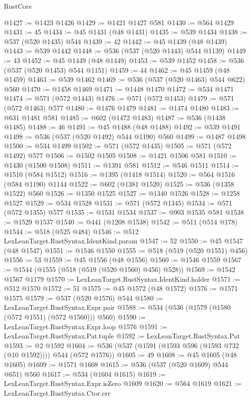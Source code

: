 \begin{lexlean}{RustCore}
\begin{coremodule}
@1427 := @1423 @1426
@1429 := @1421 @1427 @581
@1430 := @564 @1429
@1431 := 45
@1434 := @45 @1431 (@48 @1431)
@1435 := @539 @1434
@1438 := @537 (@520 @1435) @544
@1439 := 42
@1442 := @45 @1439 (@48 @1439)
@1443 := @539 @1442
@1448 := @536 (@537 (@520 @1443) @544 @1139)
@1449 := 43
@1452 := @45 @1449 (@48 @1449)
@1453 := @539 @1452
@1458 := @536 (@537 (@520 @1453) @544 @1151)
@1459 := 44
@1462 := @45 @1459 (@48 @1459)
@1463 := @539 @1462
@1469 := @536 (@537 (@520 @1463) @544 @622) @560
@1470 := @1458 @1469
@1471 := @1448 @1470
@1472 := @534 @1471
@1474 := @571 (@572 @1443)
@1476 := @571 (@572 @1453)
@1479 := @571 (@572 @1463) @577
@1480 := @1476 @1479
@1481 := @1474 @1480
@1483 := @631 @1481 @581
@1485 := @602 (@1472 @1483)
@1487 := @536 (@1438 @1485)
@1488 := 46
@1491 := @45 @1488 (@48 @1488)
@1492 := @539 @1491
@1498 := @536 (@537 (@520 @1492) @544 @1190) @560
@1499 := @1487 @1498
@1500 := @534 @1499
@1502 := @571 (@572 @1435)
@1505 := @571 (@572 @1492) @577
@1506 := @1502 @1505
@1508 := @1421 @1506 @581
@1510 := @1430 (@1500 @1508)
@1511 := @1391 @581
@1512 := @546 @1511
@1514 := @1510 (@584 @1512)
@1516 := @1395 (@1418 @1514)
@1520 := @564 @1516 (@584 @1190) @1144
@1522 := @602 (@1381 @1520)
@1525 := @536 (@1358 @1522) @560
@1526 := @1350 @1525
@1527 := @1340 @1526
@1528 := @1258 @1527
@1529 := @534 @1528
@1531 := @571 (@572 @1345)
@1534 := @571 (@572 @1355) @577
@1535 := @1531 @1534
@1537 := @903 @1535 @581
@1538 := @1529 @1537
@1540 := @441 (@1208 @1538)
@1542 := @511 (@514 @178)
@1544 := @518 (@525 @484)
@1546 := @512 LexLeanTarget.RustSyntax.IdentKind.param
@1547 := 52
@1550 := @45 @1547 (@48 @1547)
@1551 := @1546 @1550
@1555 := @518 (@519 (@520 @1551) @456)
@1556 := 53
@1559 := @45 @1556 (@48 @1556)
@1560 := @1546 @1559
@1567 := @1544 (@1555 (@518 (@519 (@520 @1560) @456) @528))
@1569 := @1542 @1567 @1179
@1570 := LexLeanTarget.RustSyntax.IdentKind.holder
@1571 := @512 @1570
@1572 := 51
@1575 := @45 @1572 (@48 @1572)
@1576 := @1571 @1575
@1579 := @537 (@520 @1576) @544
@1580 := LexLeanTarget.RustSyntax.Expr.pair
@1588 := @534 (@536 (@1579 (@1580 (@572 @1551) (@572 @1560))) @560)
@1590 := LexLeanTarget.RustSyntax.Expr.loop @1576
@1591 := LexLeanTarget.RustSyntax.Pat.tuple
@1592 := LexLeanTarget.RustSyntax.Pat
@1593 := @2 @1592
@1604 := @536 (@537 (@1591 (@1593 @596 (@1593 @732 (@10 @1592)))) @544 (@572 @1576))
@1605 := 49
@1608 := @45 @1605 (@48 @1605)
@1609 := @1571 @1608
@1615 := @536 (@537 (@520 @1609) @544 @651) @560
@1617 := @534 (@1604 @1615)
@1619 := LexLeanTarget.RustSyntax.Expr.isZero @1609
@1620 := @564 @1619
@1621 := LexLeanTarget.RustSyntax.Ctor.err

\end{coremodule}
\end{lexlean}
